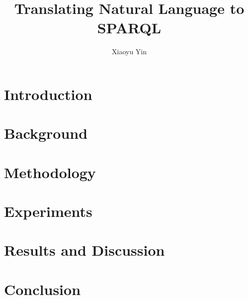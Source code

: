 \documentclass[hyperref, lof, lot, noproblem, masterofscience]{cgvpub}
\author{Xiaoyu Yin}
\title{Translating Natural Language to SPARQL}
\begin{document}
\chapter{Introduction} \label{chapter:introduction}




\chapter{Background} \label{chapter:background}





\chapter{Methodology} \label{chapter:methodology}




\chapter{Experiments} \label{chapter:experiments}




\chapter{Results and Discussion} \label{chapter:analysis}





%


\chapter{Conclusion} \label{chapter:conclusion}


\end{document}
